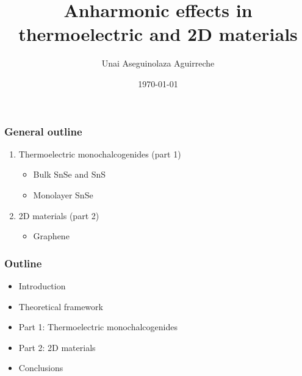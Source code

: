 \documentclass{beamer}
\author{Unai Aseguinolaza Aguirreche}
\title{Anharmonic effects in thermoelectric and 2D materials}
\institute{Supervided by Aitor Bergara and Ion Errea}
\date{\today}
\begin{document}

\begin{frame}
 \titlepage
\end{frame}

\begin{frame}

\frametitle{General outline}
\begin{enumerate}
	\item Thermoelectric monochalcogenides (part 1)
	\begin{itemize}
		\item Bulk SnSe and SnS
		\item Monolayer SnSe
	\end{itemize}
	\vspace{2cm}
\item 2D materials (part 2)
	\begin{itemize}
		\item Graphene
	\end{itemize}
\end{enumerate}

\end{frame}

\begin{frame}

\frametitle{Outline}
\begin{itemize}
\item Introduction
\vspace{0.5cm}
\item Theoretical framework
\vspace{0.5cm}
\item Part 1: Thermoelectric monochalcogenides
\vspace{0.5cm}
\item Part 2: 2D materials
\vspace{0.5cm}
\item Conclusions
\end{itemize}

\end{frame}
\end{document}
